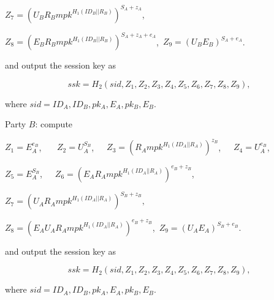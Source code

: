 \documentclass[final,1p,times,twocolumn]{elsarticle}
\begin{document}
$Z_{7}=(U_{B}R_{B}mpk^{H_{1}(ID_{B}||R_{B})})^{S_{A}+z_{A}}$,

\vspace{0.1cm}

$Z_{8}=(E_{B}R_{B}mpk^{H_{1}(ID_{B}||R_{B})})^{S_{A}+z_{A}+e_{A}}$,\ $Z_{9}=(U_{B}E_{B})^{S_{A}+e_{A}}$.

and output the session key as

\vspace{0.1cm}

$$ssk=H_{2}(sid,Z_{1},Z_{2},Z_{3},Z_{4},Z_{5},Z_{6},Z_{7},Z_{8},Z_{9}),$$

\vspace{0.1cm}

where $sid=ID_{A},ID_{B},pk_{A},E_{A},pk_{B},E_{B}$.

\vspace{0.2cm}

Party $B$: compute

\vspace{0.1cm}

$Z_{1}=E_{A}^{e_{B}}$, \ \ \ $Z_{2}=U_{A}^{S_{B}}$,\ \ \ $Z_{3}=(R_{A}mpk^{H_{1}(ID_{A}||R_{A})})^{z_{B}}$,\ \ \ $Z_{4}=U_{A}^{e_{B}}$,

\vspace{0.1cm}

$Z_{5}=E_{A}^{S_{B}}$,\ \ \  $Z_{6}=(E_{A}R_{A}mpk^{H_{1}(ID_{A}||R_{A})})^{e_{B}+z_{B}}$,\ \ \ \

\vspace{0.1cm}

$Z_{7}=(U_{A}R_{A}mpk^{H_{1}(ID_{A}||R_{A})})^{S_{B}+z_{B}},$

\vspace{0.1cm}

$Z_{8}=(E_{A}U_{A}R_{A}mpk^{H_{1}(ID_{A}||R_{A})})^{e_{B}+z_{B}}$,\ $Z_{9}=(U_{A}E_{A})^{S_{B}+e_{B}}$.

and output the session key as

\vspace{0.1cm}

$$ssk=H_{2}(sid,Z_{1},Z_{2},Z_{3},Z_{4},Z_{5},Z_{6},Z_{7},Z_{8},Z_{9}),$$

\vspace{0.1cm}

where $sid=ID_{A},ID_{B},pk_{A},E_{A},pk_{B},E_{B}$.
\end{document}
